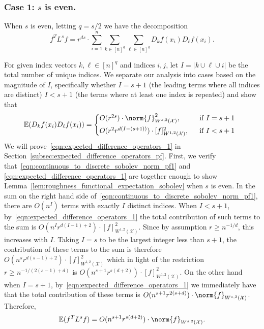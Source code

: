 \documentclass{article}
\newcommand{\abs}[1]{\left \lvert #1 \right \rvert}
\newcommand{\1}{\mathbf{1}}
\newcommand{\Xset}{\mathcal{X}}
\newcommand{\Ebb}{\mathbb{E}}
\theoremstyle{alden}
\theoremstyle{aldenthm}
\theoremstyle{definition}
\theoremstyle{remark}
\begin{document}
\subsubsection{Case 1: $s$ is even.}
When $s$ is even, letting $q = s/2$ we have the decomposition
\begin{equation}
\label{eqn:continuous_to_discrete_sobolev_norm_pf1}
f^T L^s f =  r^{ds} \cdot \sum_{i = 1}^{n} \sum_{k \in [n]^q} \sum_{\ell \in [n]^q} D_kf(x_i) D_{\ell}f(x_i). 
\end{equation}

For given index vectors $k,\ell \in [n]^q$ and indices $i,j$, let $I = \abs{k \cup \ell \cup i}$ be the total number of unique indices. We separate our analysis into cases based on the magnitude of $I$, specifically whether $I = s + 1$ (the leading terms where all indices are distinct) $I < s + 1$ (the terms where at least one index is repeated) and show that
\begin{equation}
\label{eqn:expected_difference_operators_1}
\Ebb(D_kf(x_i) D_\ell f(x_i)) =
\begin{cases*}
O(r^{2s}) \cdot \norm{f}_{W^{s,2}(\Xset)}^2, & ~~\textrm{if $I = s + 1$} \\
O(r^{2} r^{d(I - (s + 1))}) \cdot [f]_{W^{1,2}(\Xset)}^2, & ~~\textrm{if $I < s + 1$}~ 
\end{cases*}
\end{equation}
We will prove~\eqref{eqn:expected_difference_operators_1} in Section~\ref{subsec:expected_difference_operators_pf}. First, we verify that~\eqref{eqn:continuous_to_discrete_sobolev_norm_pf1} and \eqref{eqn:expected_difference_operators_1} are together enough to show Lemma~\ref{lem:roughness_functional_expectation_sobolev} when $s$ is even. In the sum on the right hand side of~\eqref{eqn:continuous_to_discrete_sobolev_norm_pf1}, there are $O(n^{I})$ terms with exactly $I$ distinct indices. When $I < s + 1$, by~\eqref{eqn:expected_difference_operators_1} the total contribution of such terms to the sum is $O(n^{I}r^{d(I - 1) + 2}) \cdot [f]_{W^{1,2}(\Xset)}^2$. Since by assumption $r \geq n^{-1/d}$, this increases with $I$. Taking $I = s$ to be the largest integer less than $s + 1$, the contribution of these terms to the sum is therefore $O(n^sr^{d(s - 1) + 2}) \cdot [f]_{W^{1,2}(\Xset)}^2$ which in light of the restriction $r \geq n^{-1/(2(s - 1) + d)}$ is $O(n^{s+1}r^{s(d +2)}) \cdot [f]_{W^{1,2}(\Xset)}^2$. On the other hand when $I = s + 1$, by~\eqref{eqn:expected_difference_operators_1} we immediately have that the total contribution of these terms is $O(n^{s + 1}r^{2(s + d)}) \cdot \norm{f}_{W^{s,2}(\Xset)}$. Therefore,
\begin{equation*}
\Ebb(f^T L^s f) = O(n^{s+1}r^{s(d+2)}) \cdot \norm{f}_{W^{s,2}(\Xset)}.
\end{equation*}
\end{document}
